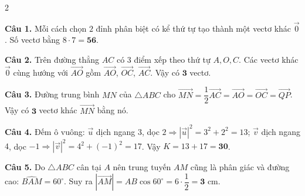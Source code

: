 \documentclass[12pt,a4paper]{article}
\begin{document}
\begin{multicols}{2}

\small\sloppy

\textbf{Câu 1.} Mỗi cách chọn $2$ đỉnh phân biệt có kể thứ tự tạo thành một vectơ khác $\vec{0}$. Số vectơ bằng $8 \cdot 7 = \mathbf{56}$.\par\vspace{3pt}

\textbf{Câu 2.} Trên đường thẳng $AC$ có $3$ điểm xếp theo thứ tự $A, O, C$. Các vectơ khác $\vec{0}$ cùng hướng với $\vec{AO}$ gồm $\vec{AO}$, $\vec{OC}$, $\vec{AC}$. Vậy có $\mathbf{3}$ vectơ.\par\vspace{3pt}

\textbf{Câu 3.} Đường trung bình $MN$ của $\triangle ABC$ cho $\vec{MN} = \dfrac{1}{2}\vec{AC} = \vec{AO} = \vec{OC} = \vec{QP}$. Vậy có $\mathbf{3}$ vectơ khác $\vec{MN}$ bằng nó.\par\noindent\begin{minipage}{\linewidth}\centering\vspace{3pt}\vspace{2pt}\end{minipage}\par\vspace{3pt}

\textbf{Câu 4.} Đếm ô vuông: $\vec{u}$ dịch ngang $3$, dọc $2 \Rightarrow |\vec{u}|^2 = 3^2 + 2^2 = 13$; $\vec{v}$ dịch ngang $4$, dọc $-1 \Rightarrow |\vec{v}|^2 = 4^2 + (-1)^2 = 17$. Vậy $K = 13 + 17 = \mathbf{30}$.\par\vspace{3pt}

\textbf{Câu 5.} Do $\triangle ABC$ cân tại $A$ nên trung tuyến $AM$ cũng là phân giác và đường cao: $\widehat{BAM} = 60^\circ$. Suy ra $|\vec{AM}| = AB\cos 60^\circ = 6 \cdot \dfrac{1}{2} = \mathbf{3}\text{ cm}$.\par\vspace{3pt}


\end{multicols}
\end{document}
